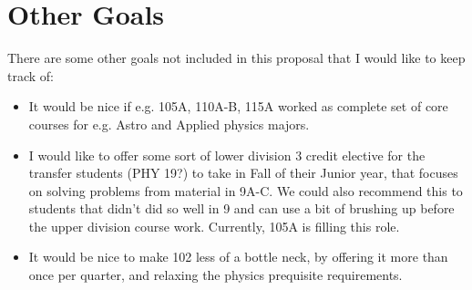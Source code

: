 \documentclass[12pt]{article}
\begin{document}
\section{Other Goals}
There are some other goals not included in this proposal that I would like to keep track of:
\begin{itemize}
\item It would be nice if e.g. 105A, 110A-B, 115A worked as complete set of core courses for e.g. Astro and Applied physics majors. 
\item I would like to offer some sort of lower division 3 credit elective for the transfer students (PHY 19?) to take in Fall of their Junior year, that focuses on solving problems from material in 9A-C.  We could also recommend this to students that didn't did so well in 9 and can use a bit of brushing up before the upper division course work.  Currently, 105A is filling this role.
\item It would be nice to make 102 less of a bottle neck, by offering it more than once per quarter, and relaxing the physics prequisite requirements.
\end{itemize}
\end{document}
